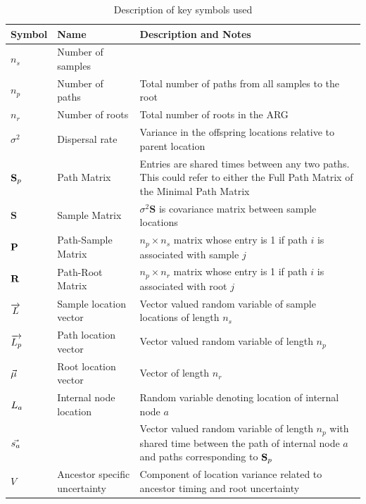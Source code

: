 \begin{table}
\caption{Description of key symbols used}
\begin{center}
\begin{tabular}{ | m{3.5em}|m{9em}|m{20em}| } 
 \hline
 Symbol & Name & Description and Notes \\ 
 \hline
 $n_s$ & Number of samples &  \\ 
 \hline
 $n_p$ & Number of paths & Total number of paths from all samples to the root \\ 
 \hline
 $n_r$ & Number of roots & Total number of roots in the ARG \\ 
 \hline
 $\sigma^2$ & Dispersal rate & Variance in the offspring locations relative to parent location \\ 
 \hline
 $\mathbf{S}_p$ & Path Matrix & Entries are shared times between any two paths. This could refer to either the Full Path Matrix of the Minimal Path Matrix  \\
 \hline
 $\mathbf{S}$ & Sample Matrix & $\sigma^2 \mathbf{S}$ is covariance matrix between sample locations \\ 
 \hline
 $\mathbf{P}$ & Path-Sample Matrix & $n_p \times n_s$ matrix whose entry is 1 if path $i$ is associated with sample $j$ \\ 
 \hline
 $\mathbf{R}$ & Path-Root Matrix & $n_p \times n_r$ matrix whose entry is 1 if path $i$ is associated with root $j$ \\ 
 \hline
 $\overrightarrow{L}$ & Sample location vector & Vector valued random variable of sample locations of length $n_s$  \\ 
 \hline
 $\overrightarrow{L_p}$ & Path location vector &  Vector valued random variable of length $n_p$\\ 
 \hline
 $\vec{\mu}$ & Root location vector &  Vector of length $n_r$\\ 
 \hline
 $L_a$ & Internal node location & Random variable denoting location of internal node $a$\\ 
 \hline
 $\vec{s_a}$ &  & Vector valued random variable of length $n_p$ with shared time between the path of internal node $a$ and paths corresponding to $\mathbf{S}_p$ \\ 
 \hline
 $V$ & Ancestor specific uncertainty & Component of location variance related to ancestor timing and root uncertainty \\
 \hline
\end{tabular}
\label{table:methods}
\end{center}
\end{table}


